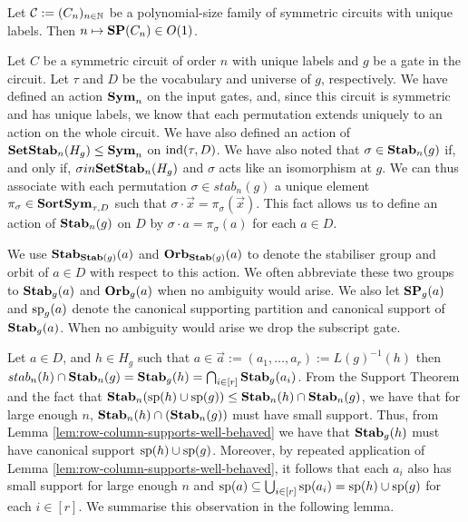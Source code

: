 \documentclass[../paper.tex]{subfiles}
\begin{document}
\begin{cor}
  Let $\mathcal{C} := (C_n)_{n \in \mathbb{N}}$ be a polynomial-size family of
  symmetric circuits with unique labels. Then $n \mapsto \text{\textbf{SP}}(C_n) \in O(1)$.
  \label{cor:constant-size-support}
\end{cor}



Let $C$ be a symmetric circuit of order $n$ with unique labels and $g$ be a gate
in the circuit. Let $\tau$ and $D$ be the vocabulary and universe of $g$,
respectively. We have defined an action $\text{\textbf{Sym}}_n$ on the input gates, and, since
this circuit is symmetric and has unique labels, we know that each permutation
extends uniquely to an action on the whole circuit. We have also defined an
action of $\text{\textbf{SetStab}}_n(H_g) \leq \text{\textbf{Sym}}_n$ on $\text{\upshape ind}(\tau, D)$. We have also noted
that $\sigma \in \text{\textbf{Stab}}_n(g)$ if, and only if, $\sigma in \text{\textbf{SetStab}}_n(H_g)$ and
$\sigma$ acts like an isomorphism at $g$. We can thus associate with each
permutation $\sigma \in stab_n(g)$ a unique element $\pi_\sigma \in \text{\textbf{SortSym}}_{\tau,D}$
such that $\sigma \cdot \vec{x} = \pi_{\sigma} (\vec{x})$. This fact allows us
to define an action of $\text{\textbf{Stab}}_n(g)$ on $D$ by $\sigma \cdot a = \pi_\sigma(a)$
for each $a \in D$.

We use $\text{\textbf{Stab}}_{\text{\textbf{Stab}}(g)}(a)$ and $\text{\textbf{Orb}}_{\text{\textbf{Stab}}(g)}(a)$ to denote the stabiliser
group and orbit of $a \in D$ with respect to this action. We often abbreviate
these two groups to $\text{\textbf{Stab}}_{g}(a)$ and $\text{\textbf{Orb}}_{g}(a)$ when no ambiguity would
arise. We also let $\text{\textbf{SP}}_g(a)$ and $\text{sp}_g(a)$ denote the canonical supporting
partition and canonical support of $\text{\textbf{Stab}}_g(a)$. When no ambiguity would arise
we drop the subscript gate.

Let $a \in D$, and $h \in H_g$ such that $a \in \vec{a} := (a_1, \ldots , a_r)
:= L(g)^{-1}(h)$ then $stab_n(h) \cap \text{\textbf{Stab}}_n(g) = \text{\textbf{Stab}}_g(h) = \bigcap_{i \in
  [r]}\text{\textbf{Stab}}_g(a_i)$. From the Support Theorem and the fact that
$\text{\textbf{Stab}}_n(\text{sp}(h) \cup \text{sp}(g)) \leq \text{\textbf{Stab}}_n(h) \cap \text{\textbf{Stab}}_n(g)$, we have
that for large enough $n$, $\text{\textbf{Stab}}_n(h) \cap (\text{\textbf{Stab}}_n(g))$ must have small
support. Thus, from Lemma \ref{lem:row-column-supports-well-behaved} we have
that $\text{\textbf{Stab}}_g(h)$ must have canonical support $\text{sp}(h) \cup \text{sp}(g)$.
Moreover, by repeated application of Lemma
\ref{lem:row-column-supports-well-behaved}, it follows that each $a_i$ also has
small support for large enough $n$ and $\text{sp}(a) \subseteq \bigcup_{i \in
  [r]}\text{sp}(a_i) = \text{sp}(h) \cup \text{sp}(g)$ for each $i \in [r]$. We summarise
this observation in the following lemma.
\end{document}
